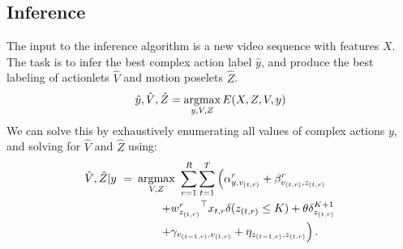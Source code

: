 \subsection{Inference}
\label{subsec:inference}
The input to the inference algorithm is a new video sequence with features
$X$. The task is to infer the best complex action label $\hat y$, and produce the best labeling of actionlets $\hat V$ and motion poselets $\hat Z$.
\begin{equation}
  \hat y, \hat V, \hat Z = \operatorname*{argmax}_{y, V, Z} E(X, Z, V, y)
\end{equation}
We can solve this by exhaustively enumerating all values of complex actions $y$, and solving for $\hat{V}$ and $\hat{Z}$ using:
\begin{equation}
\begin{split}
 \hat{V}, \hat{Z} | y ~ =~ &   \argmax_{V,Z} ~   \sum_{r=1}^R \sum_{t=1}^T \left( \alpha^r_{y,v_{(t,r)}} 
                  + \beta^r_{v_{(t,r)},z_{(t,r)}}\right. \\
				&\quad\quad \left.+ {w^r_{z_{(t,r)}}}^\top x_{t,r} \delta(z_{(t,r)} \le K)  + \theta \delta_{z_{(t,r)}}^{K+1} \right. \\ 
				& \quad\quad \left.+ \gamma_{v_{({t-1},r)},v_{(t,r)}} + \eta_{z_{({t-1},r)},z_{(t,r)}}  \vphantom{{w^r_{z_{(t,r)}}}^\top x_{t,r}} \right). \\
\end{split}
\label{eq:classify_inference}
\end{equation}
